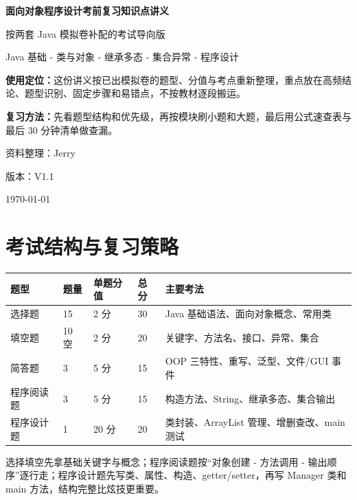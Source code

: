 \documentclass[UTF8,zihao=-4]{ctexart}
\begin{document}
\begin{titlepage}
\centering
\vspace*{2.3cm}
{\Huge\bfseries\sffamily 面向对象程序设计考前复习知识点讲义\par}
\vspace{0.75cm}
{\Large 按两套 Java 模拟卷补配的考试导向版\par}
\vspace{0.45cm}
{\large Java 基础 - 类与对象 - 继承多态 - 集合异常 - 程序设计\par}
\vfill
\begin{tcolorbox}[colback=lightblue,colframe=mainblue,width=0.86\textwidth,arc=2mm]
\textbf{使用定位：}这份讲义按已出模拟卷的题型、分值与考点重新整理，重点放在高频结论、题型识别、固定步骤和易错点，不按教材逐段搬运。\par
\textbf{复习方法：}先看题型结构和优先级，再按模块刷小题和大题，最后用公式速查表与最后 30 分钟清单做查漏。
\end{tcolorbox}
\vfill
{\large 资料整理：Jerry\par}
{\large 版本：V1.1\par}
{\large \today\par}
\end{titlepage}
\tableofcontents
\newpage

\section{考试结构与复习策略}

\begin{longtable}{p{}p{}p{}p{}p{}}
\toprule
\textbf{题型} & \textbf{题量} & \textbf{单题分值} & \textbf{总分} & \textbf{主要考法} \\
\midrule
选择题 & 15 & 2 分 & 30 & Java 基础语法、面向对象概念、常用类 \\
填空题 & 10 空 & 2 分 & 20 & 关键字、方法名、接口、异常、集合 \\
简答题 & 3 & 5 分 & 15 & OOP 三特性、重写、泛型、文件/GUI 事件 \\
程序阅读题 & 3 & 5 分 & 15 & 构造方法、String、继承多态、集合输出 \\
程序设计题 & 1 & 20 分 & 20 & 类封装、ArrayList 管理、增删查改、main 测试 \\
\bottomrule
\end{longtable}

\begin{keybox}[拿分顺序]
选择填空先拿基础关键字与概念；程序阅读题按“对象创建 - 方法调用 - 输出顺序”逐行走；程序设计题先写类、属性、构造、getter/setter，再写 Manager 类和 main 方法，结构完整比炫技更重要。
\end{keybox}
\end{document}
